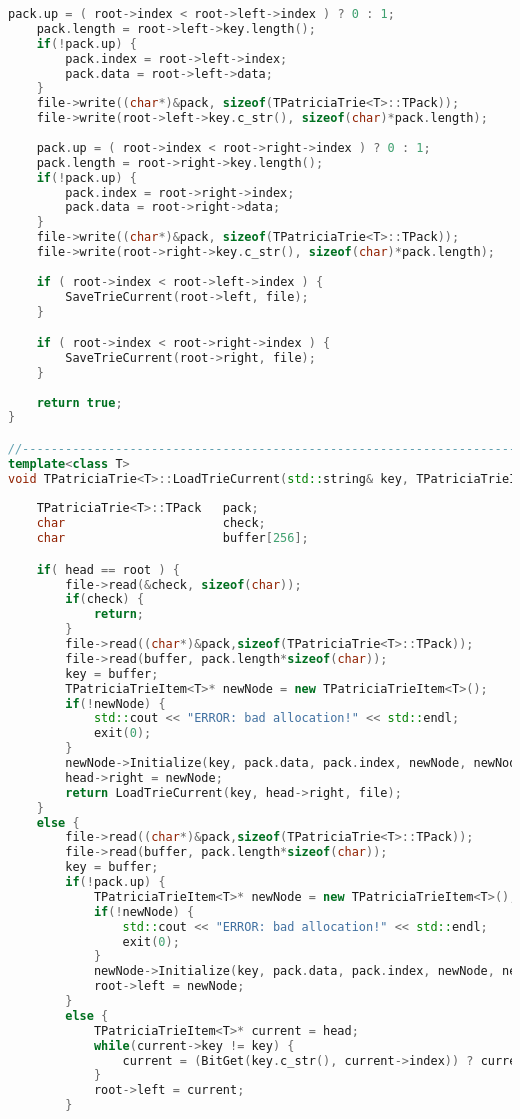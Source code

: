 \begin{lstlisting}[language=C++]
    pack.up = ( root->index < root->left->index ) ? 0 : 1;
    pack.length = root->left->key.length();
    if(!pack.up) {
        pack.index = root->left->index;
        pack.data = root->left->data;
    }
    file->write((char*)&pack, sizeof(TPatriciaTrie<T>::TPack));
    file->write(root->left->key.c_str(), sizeof(char)*pack.length);
    
    pack.up = ( root->index < root->right->index ) ? 0 : 1;
    pack.length = root->right->key.length();
    if(!pack.up) {
        pack.index = root->right->index;
        pack.data = root->right->data;
    }
    file->write((char*)&pack, sizeof(TPatriciaTrie<T>::TPack));
    file->write(root->right->key.c_str(), sizeof(char)*pack.length);
    
    if ( root->index < root->left->index ) {
        SaveTrieCurrent(root->left, file);
    }

    if ( root->index < root->right->index ) {
        SaveTrieCurrent(root->right, file);
    }
    
    return true;
}

//----------------------------------------------------------------------------
template<class T>
void TPatriciaTrie<T>::LoadTrieCurrent(std::string& key, TPatriciaTrieItem<T>* root, std::ifstream* file) {
    
    TPatriciaTrie<T>::TPack   pack;
    char                      check;
    char                      buffer[256];

    if( head == root ) {
        file->read(&check, sizeof(char));
        if(check) {
            return;
        }
        file->read((char*)&pack,sizeof(TPatriciaTrie<T>::TPack));
        file->read(buffer, pack.length*sizeof(char));
        key = buffer;
        TPatriciaTrieItem<T>* newNode = new TPatriciaTrieItem<T>();
        if(!newNode) {
            std::cout << "ERROR: bad allocation!" << std::endl;
            exit(0);
        }
        newNode->Initialize(key, pack.data, pack.index, newNode, newNode);
        head->right = newNode;
        return LoadTrieCurrent(key, head->right, file);
    }
    else {
        file->read((char*)&pack,sizeof(TPatriciaTrie<T>::TPack));
        file->read(buffer, pack.length*sizeof(char));
        key = buffer;
        if(!pack.up) {
            TPatriciaTrieItem<T>* newNode = new TPatriciaTrieItem<T>();
            if(!newNode) {
                std::cout << "ERROR: bad allocation!" << std::endl;
                exit(0);
            }
            newNode->Initialize(key, pack.data, pack.index, newNode, newNode);
            root->left = newNode;
        }
        else {
            TPatriciaTrieItem<T>* current = head;
            while(current->key != key) {
                current = (BitGet(key.c_str(), current->index)) ? current->right : current->left;
            }
            root->left = current;
        }
        

\end{lstlisting}
